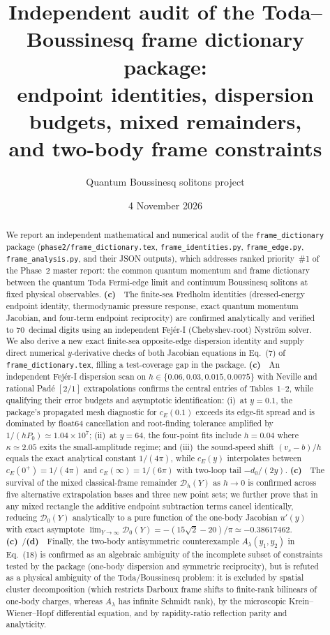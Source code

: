 \documentclass[11pt,a4paper]{article}
\title{Independent audit of the Toda--Boussinesq frame dictionary package:\\
endpoint identities, dispersion budgets, mixed remainders,\\and two-body frame constraints}
\author{Quantum Boussinesq solitons project}
\date{4 November 2026}
\newcommand{\Lc}{\textsf{\textbf{(c)}}\ }
\newcommand{\Ld}{\textsf{\textbf{(d)}}\ }
\begin{document}
\maketitle

\begin{abstract}
We report an independent mathematical and numerical audit of the
\texttt{frame\_\allowbreak dictionary} package (\texttt{phase2/frame\_\allowbreak dictionary.tex},
\texttt{frame\_\allowbreak identities.py}, \texttt{frame\_\allowbreak edge.py},
\texttt{frame\_\allowbreak analysis.py}, and their JSON outputs), which addresses
ranked priority~\#1 of the Phase~2 master report: the common quantum
momentum and frame dictionary between the quantum Toda Fermi-edge limit and
continuum Boussinesq solitons at fixed physical observables.
\Lc\ The finite-sea Fredholm identities (dressed-energy endpoint identity,
thermodynamic pressure response, exact quantum momentum Jacobian, and four-term
endpoint reciprocity) are confirmed analytically and verified to 70~decimal
digits using an independent Fej\'er-I (Chebyshev-root) Nystr\"om solver. We also
derive a new exact finite-sea opposite-edge dispersion identity and supply direct
numerical $y$-derivative checks of both Jacobian equations in Eq.~(7) of
\texttt{frame\_\allowbreak dictionary.tex}, filling a test-coverage gap in the package.
\Lc\ An independent Fej\'er-I dispersion scan on $h\in\{0.06,0.03,0.015,0.0075\}$
with Neville and rational Pad\'e $[2/1]$ extrapolations confirms the central
entries of Tables~1--2, while qualifying their error budgets and asymptotic
identification: (i)~at $y=0.1$, the package's propagated mesh diagnostic for
$c_E(0.1)$ exceeds its edge-fit spread and is dominated by float64 cancellation
and root-finding tolerance amplified by $1/(hP_0)\simeq 1.04\times 10^7$;
(ii)~at $y=64$, the four-point fits include $h=0.04$ where $\kappa\simeq 2.05$
exits the small-amplitude regime; and (iii)~the sound-speed shift
$(v_s-b)/h$ equals the exact analytical constant $1/(4\pi)$, while $c_E(y)$
interpolates between $c_E(0^+)=1/(4\pi)$ and $c_E(\infty)=1/(6\pi)$ with
two-loop tail $-d_0/(2y)$.
\Lc\ The survival of the mixed classical-frame remainder $\mathcal D_h(Y)$ as
$h\to 0$ is confirmed across five alternative extrapolation bases and three new
point sets; we further prove that in any mixed rectangle the additive endpoint
subtraction terms cancel identically, reducing $\mathcal D_0(Y)$ analytically
to a pure function of the one-body Jacobian $u'(y)$ with exact asymptote
$\lim_{Y\to\infty}\mathcal D_0(Y)=-(15\sqrt2-20)/\pi\simeq -0.38617462$.
\Lc/\Ld\ Finally, the two-body antisymmetric counterexample $A_\lambda(y_1,y_2)$
in Eq.~(18) is confirmed as an algebraic ambiguity of the incomplete subset of
constraints tested by the package (one-body dispersion and symmetric
reciprocity), but is refuted as a physical ambiguity of the Toda/Boussinesq
problem: it is excluded by spatial cluster decomposition (which restricts
Darboux frame shifts to finite-rank bilinears of one-body charges, whereas
$A_\lambda$ has infinite Schmidt rank), by the microscopic Krein--Wiener--Hopf
differential equation, and by rapidity-ratio reflection parity and analyticity.
\end{abstract}
\end{document}
